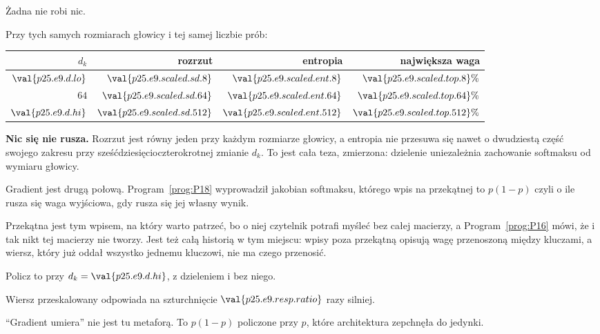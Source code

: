 \begin{fr}
\begin{ansblock}
Żadna nie robi nic.
\end{ansblock}

Przy tych samych rozmiarach głowicy i tej samej liczbie prób:

\begin{center}
\begin{tabular}{rrrr}
\toprule
$d_k$ & rozrzut & entropia & największa waga \\
\midrule
$\val{p25.e9.d.lo}$ & $\val{p25.e9.scaled.sd.8}$ &
  $\val{p25.e9.scaled.ent.8}$ & $\val{p25.e9.scaled.top.8}\%$ \\
$64$ & $\val{p25.e9.scaled.sd.64}$ & $\val{p25.e9.scaled.ent.64}$ &
  $\val{p25.e9.scaled.top.64}\%$ \\
$\val{p25.e9.d.hi}$ & $\val{p25.e9.scaled.sd.512}$ &
  $\val{p25.e9.scaled.ent.512}$ & $\val{p25.e9.scaled.top.512}\%$ \\
\bottomrule
\end{tabular}
\end{center}

\textbf{Nic się nie rusza.} Rozrzut jest równy jeden przy każdym rozmiarze
głowicy, a entropia nie przesuwa się nawet o dwudziestą część swojego zakresu
przy sześćdziesięcioczterokrotnej zmianie $d_k$. To jest cała teza, zmierzona:
dzielenie uniezależnia zachowanie softmaksu od wymiaru głowicy.

Gradient jest drugą połową. Program~\ref{prog:P18} wyprowadził jakobian
softmaksu, którego wpis na przekątnej to $p(1-p)$ \dash{} czyli o ile rusza się
waga wyjściowa, gdy rusza się jej własny wynik.

Przekątna jest tym wpisem, na który warto patrzeć, bo o niej czytelnik potrafi
myśleć bez całej macierzy, a Program~\ref{prog:P16} mówi, że i tak nikt tej
macierzy nie tworzy. Jest też całą historią w tym miejscu: wpisy poza
przekątną opisują wagę przenoszoną między kluczami, a wiersz, który już oddał
wszystko jednemu kluczowi, nie ma czego przenosić.

Policz to przy $d_k = \val{p25.e9.d.hi}$, z dzieleniem i bez niego.
\dotline
\nextframe
\end{fr}

\begin{fr}

Wiersz przeskalowany odpowiada na szturchnięcie $\val{p25.e9.resp.ratio}$ razy
silniej.

\enquote{Gradient umiera} nie jest tu metaforą. To $p(1-p)$ policzone przy
$p$, które architektura zepchnęła do jedynki.
\end{fr}

